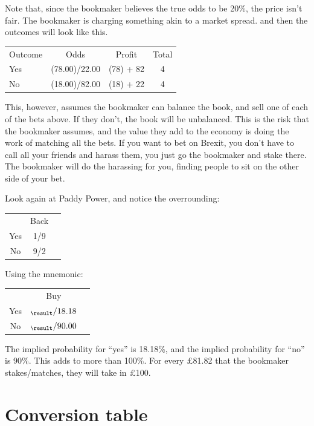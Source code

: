\documentclass[a4paper]{article}
\newcommand{\odds}[1]{%
\FPeval{\result}{round(100-#1,2)}%
${}_{\result}/#1$%
}
\begin{document}
Note that, since the bookmaker believes the true odds to be 20\%, the price isn't fair.
The bookmaker is charging something akin to a market spread.
and then the outcomes will look like this.
\begin{center}
\begin{tabular}{lccc}
\hline
Outcome                  &   Odds              & Profit     & Total \\
 Yes                     &    (78.00)/22.00    & (78)  + 82 &  4    \\
 No                      &    (18.00)/82.00    & (18)  + 22 &  4    \\ \hline
\hline
\end{tabular}
\end{center}
This, however, assumes the bookmaker can balance the book, and sell one of each of the bets above. If they don't, the book will be unbalanced.
This is the risk that the bookmaker assumes, and the value they add to the economy is doing the work of matching all the bets.
If you want to bet on Brexit, you don't have to call all your friends and harass them, you just go the bookmaker and stake there.
The bookmaker will do the harassing for you, finding people to sit on the other side of your bet.

Look again at Paddy Power, and notice the overrounding:
\begin{center}
\begin{tabular}{ccc}
\hline
       &  Back    \\
Yes    &   1/9   \\
No     &   9/2   \\
\hline
\end{tabular}
\end{center}
Using the mnemonic:
\begin{center}
\begin{tabular}{ccc}
\hline
       &  Buy           \\
Yes     &   \odds{18.18}   \\
No      &   \odds{90.00}   \\
\hline
\end{tabular}
\end{center}
The implied probability for ``yes'' is 18.18\%, and the implied probability for ``no'' is 90\%.
This adds to more than 100\%.
For every £81.82 that the bookmaker stakes/matches, they will take in £100.



\clearpage
\appendix
\section{Conversion table}

\end{document}
